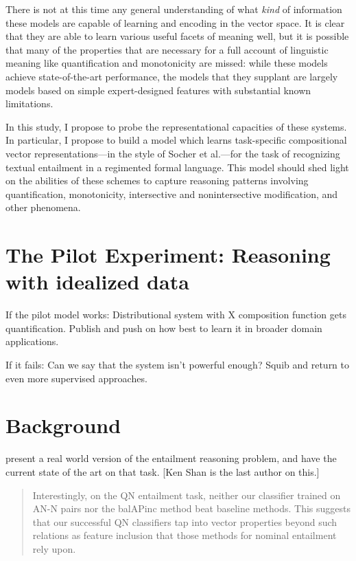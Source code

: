 \documentclass[10pt,letterpaper]{article}
\begin{document}
There is not at this time any general understanding of what \textit{kind} of information these models are capable of learning and encoding in the vector space. It is clear that they are able to learn various useful facets of meaning well, but it is possible that many of the properties that are necessary for a full account of linguistic meaning like quantification and monotonicity are missed: while these models achieve state-of-the-art performance, the models that they supplant are largely models based on simple expert-designed features with substantial known limitations.

In this study, I propose to probe the representational capacities of these systems. In particular, I propose to build a model which learns task-specific compositional vector representations---in the style of Socher et al.---for the task of recognizing textual entailment in a regimented formal language. This model should shed light on the abilities of these schemes to capture reasoning patterns involving quantification, monotonicity, intersective and nonintersective modification, and other phenomena.

\section{The Pilot Experiment: Reasoning with idealized data}

If the pilot model works: Distributional system with X composition function gets quantification. Publish and push on how best to learn it in broader domain applications.

If it fails: Can we say that the system isn't powerful enough? Squib and return to even more supervised approaches.

\section{Background}

 present a real world version of the entailment reasoning problem, and have the current state of the art on that task. [Ken Shan is the last author on this.]

\begin{quote}
Interestingly, on the QN entailment task, neither our classifier trained on AN-N pairs nor the balAPinc method beat baseline methods. This suggests that our successful QN classifiers tap into vector properties beyond such relations as feature inclusion that those methods for nominal entailment rely upon.
\end{quote}
\end{document}

